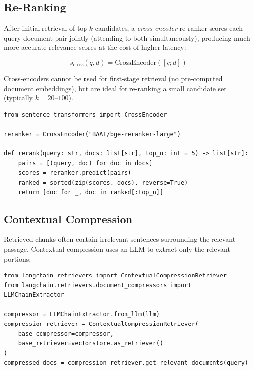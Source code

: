 \subsection{Re-Ranking}
\label{re-ranking}

After initial retrieval of top-$k$ candidates, a \emph{cross-encoder} re-ranker scores each query-document pair jointly (attending to both simultaneously), producing much more accurate relevance scores at the cost of higher latency:

\begin{equation}
  s_{\text{cross}}(q, d) = \text{CrossEncoder}([q; d])
\end{equation}

Cross-encoders cannot be used for first-stage retrieval (no pre-computed document embeddings), but are ideal for re-ranking a small candidate set (typically $k = 20$--$100$).

\begin{lstlisting}[style=pythonstyle, caption={Cross-encoder re-ranking with BGE}]
from sentence_transformers import CrossEncoder

reranker = CrossEncoder("BAAI/bge-reranker-large")

def rerank(query: str, docs: list[str], top_n: int = 5) -> list[str]:
    pairs = [(query, doc) for doc in docs]
    scores = reranker.predict(pairs)
    ranked = sorted(zip(scores, docs), reverse=True)
    return [doc for _, doc in ranked[:top_n]]
\end{lstlisting}

\subsection{Contextual Compression}
\label{contextual-compression}

Retrieved chunks often contain irrelevant sentences surrounding the relevant passage. Contextual compression uses an LLM to extract only the relevant portions:

\begin{lstlisting}[style=pythonstyle, caption={LLM-based contextual compression}]
from langchain.retrievers import ContextualCompressionRetriever
from langchain.retrievers.document_compressors import LLMChainExtractor

compressor = LLMChainExtractor.from_llm(llm)
compression_retriever = ContextualCompressionRetriever(
    base_compressor=compressor,
    base_retriever=vectorstore.as_retriever()
)
compressed_docs = compression_retriever.get_relevant_documents(query)
\end{lstlisting}

